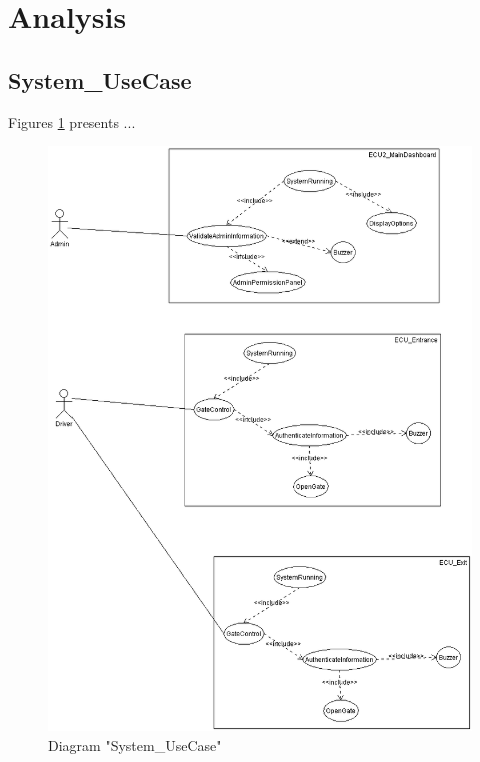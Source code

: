 
\section{Analysis}
\subsection{System\_UseCase}
Figures \ref{fig:SystemUseCaseSystemUseCase00} presents ...
\begin{figure}[htb]
\centering
\includegraphics[width=\textwidth]{img_0_0.png}
\caption{Diagram "System\_UseCase"}
\label{fig:SystemUseCaseSystemUseCase00}
\end{figure}

